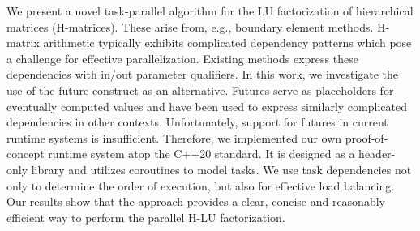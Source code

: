 We present a novel task-parallel algorithm for the LU factorization of hierarchical matrices (H-matrices). These arise from, e.g., boundary element methods. H-matrix arithmetic typically exhibits complicated dependency patterns which pose a challenge for effective parallelization. Existing methods express these dependencies with in/out parameter qualifiers. In this work, we investigate the use of the future construct as an alternative. Futures serve as placeholders for eventually computed values and have been used to express similarly complicated dependencies in other contexts. Unfortunately, support for futures in current runtime systems is insufficient.
Therefore, we implemented our own proof-of-concept runtime system atop the C++20 standard. It is designed as a header-only library and utilizes coroutines to model tasks. We use task dependencies not only to determine the order of execution, but also for effective load balancing.
Our results show that the approach provides a clear, concise and reasonably efficient way to perform the parallel H-LU factorization.
